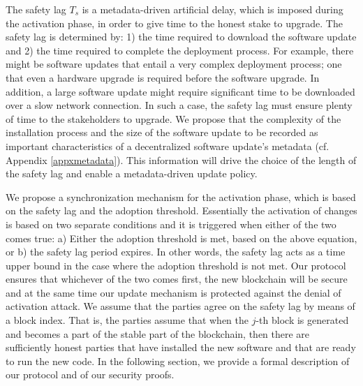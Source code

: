 The safety lag $T_s$ is a metadata-driven artificial delay, which is imposed during the activation phase, in order to give time to the honest stake to upgrade. The safety lag is determined by: 1) the time required to download the software update and 2) the time required to complete the deployment process.
 For example, there might be software updates that entail a very complex deployment process; one that even  a hardware upgrade is required before the software upgrade. In addition, a large software update might require significant time to be downloaded over a slow network connection. In such a case, the safety lag must ensure plenty of time to the stakeholders to upgrade.  
We propose that the complexity of the installation process and the size of the software update to be recorded as important characteristics of a decentralized software update's metadata (cf. Appendix \ref{appxmetadata}). This information will drive the choice of the length of the safety lag and enable a metadata-driven update policy.


We propose a synchronization mechanism for the activation phase, which is based on the safety lag and the adoption threshold. Essentially the activation of changes is based on two separate conditions and it is triggered when either of the two comes true: a) Either the adoption threshold is met, based on the above equation, or b) the safety lag period expires. In other words, the safety lag acts as a time upper bound in the case where the adoption threshold is not met. Our protocol ensures that whichever of the two comes first, the new blockchain will be secure and at the same time our update mechanism is protected against the denial of activation attack. 
We assume that the parties agree on the safety lag by means of a block index. That is, the parties assume that when the $j$-th block 
is generated and becomes a part of the stable part of the blockchain, then there are sufficiently honest parties that have installed the new software and that are ready to run the new code. 
In the following section, we provide a formal description of our protocol and of our security proofs. 





